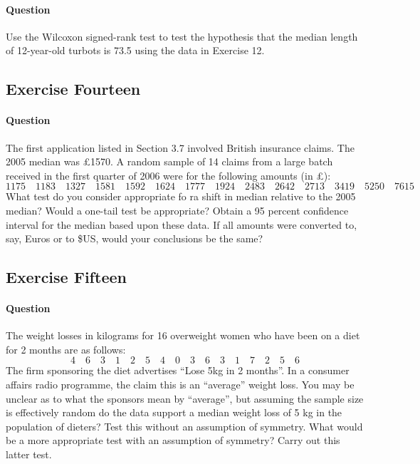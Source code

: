 \documentclass[]{article}
\let\oldparagraph\paragraph
\renewcommand{\paragraph}[1]{\oldparagraph{#1}\mbox{}}
\begin{document}
\paragraph{Question}\label{question-12}

Use the Wilcoxon signed-rank test to test the hypothesis that the median
length of 12-year-old turbots is 73.5 using the data in Exercise 12.

\subsection{Exercise Fourteen}\label{exercise-fourteen}

\paragraph{Question}\label{question-13}

The first application listed in Section 3.7 involved British insurance
claims. The 2005 median was £1570. A random sample of 14 claims from a
large batch received in the first quarter of 2006 were for the following
amounts (in £): \[
1175\quad1183\quad1327\quad1581\quad1592\quad1624\quad1777\quad1924\quad2483\quad2642\quad2713\quad3419\quad5250\quad7615
\] What test do you consider appropriate fo ra shift in median relative
to the 2005 median? Would a one-tail test be appropriate? Obtain a 95
percent confidence interval for the median based upon these data. If all
amounts were converted to, say, Euros or to \$US, would your conclusions
be the same?

\subsection{Exercise Fifteen}\label{exercise-fifteen}

\paragraph{Question}\label{question-14}

The weight losses in kilograms for 16 overweight women who have been on
a diet for 2 months are as follows: \[
4\quad6\quad3\quad1\quad2\quad5\quad4\quad0\quad3\quad6\quad3\quad1\quad7\quad2\quad5\quad6
\] The firm sponsoring the diet advertises ``Lose 5kg in 2 months''. In
a consumer affairs radio programme, the claim this is an ``average''
weight loss. You may be unclear as to what the sponsors mean by
``average'', but assuming the sample size is effectively random do the
data support a median weight loss of 5 kg in the population of dieters?
Test this without an assumption of symmetry. What would be a more
appropriate test with an assumption of symmetry? Carry out this latter
test.
\end{document}
